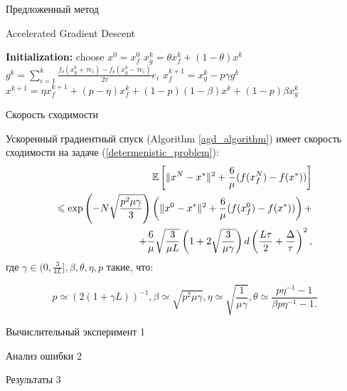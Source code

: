\documentclass{beamer}
\begin{document}


\begin{frame}{Предложенный метод}

\begin{algorithm}[H]
\caption{ Accelerated Gradient Descent }
\label{agd_algorithm}
\begin{algorithmic}
\State\textbf{Initialization:} choose $x^0 = x_f^0$
		\State $x_g^k = \theta x_f^k + (1 - \theta)x^k$
		\State $g^k = \sum\limits_{i = 1}^k \frac{f_\delta(x_g^k + \tau e_i) - f_\delta(x_g^k - \tau e_i)}{2\tau}e_i$
		\State $x_f^{k + 1} = x_g^k - p \gamma g^k$
		\State $x^{k + 1} = \eta x_f^{k + 1} + (p - \eta) x_f^k + (1 - p)(1 - \beta) x^k + (1 - p)\beta x_g^k$
   \EndFor
\end{algorithmic}
\end{algorithm}

\end{frame}


\begin{frame}{Скорость сходимости}
\begin{theorem}\label{theorem1}
  Ускоренный градиентный спуск (Algorithm \ref{agd_algorithm}) имеет скорость сходимости на задаче (\ref{determenistic_problem}):
  \begin{equation}
   \begin{aligned}
   \mathbb{E}\left[\|x^N - x^*\|^2 + \frac{6}{\mu} (f(x_f^N) - f(x^*))\right] \hfill\\
   \leqslant \exp\left(- N\sqrt{\frac{p^2\mu\gamma}{3}}\right) \left(\|x^0 - x^*\|^2 + \frac{6}{\mu} (f(x_f^0) - f(x^*))\right) + \\
   + \frac{6}{\mu} \sqrt{\frac{3}{\mu L}} \left(1 + 2\sqrt{\frac{3}{\mu \gamma}}\right) d \left(\frac{L\tau}{2} + \frac{\Delta}{\tau}\right)^2,
   \label{deterministic_convergence}
   \end{aligned}
  \end{equation}
  где $\gamma \in (0, \frac{3}{4L}], \beta, \theta, \eta, p$ такие, что:

  \begin{equation}
   p \simeq (2(1 + \gamma L))^{-1}, \beta \simeq \sqrt{p^2 \mu \gamma}, \eta \simeq \sqrt{\frac{1}{\mu\gamma}}, \theta \simeq \frac{p \eta^{-1} - 1}{\beta p \eta^{-1} - 1.}
  \end{equation}

\end{theorem}
\end{frame}

\begin{frame}{Вычислительный эксперимент}
1
\end{frame}


\begin{frame}{Анализ ошибки}
2
\end{frame}


\begin{frame}{Результаты}
3
\end{frame}
\end{document}
